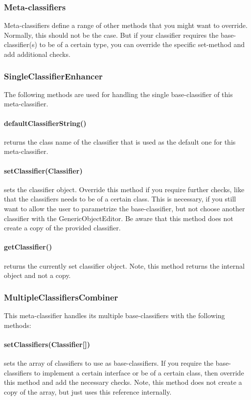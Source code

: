 \newpage
\subsubsection*{Meta-classifiers}
Meta-classifiers define a range of other methods that you might want to
override. Normally, this should not be the case. But if your classifier requires
the base-classifier(s) to be of a certain type, you can override the specific
set-method and add additional checks.

\subsubsection*{SingleClassifierEnhancer}
The following methods are used for handling the single base-classifier of this
meta-classifier.

\paragraph{defaultClassifierString()} returns the class name of the classifier
that is used as the default one for this meta-classifier.

\paragraph{setClassifier(Classifier)} sets the classifier object. Override this
method if you require further checks, like that the classifiers needs to be of
a certain class. This is necessary, if you still want to allow the user to
parametrize the base-classifier, but not choose another classifier with the
GenericObjectEditor. Be aware that this method does not create a copy of the
provided classifier.

\paragraph{getClassifier()} returns the currently set classifier object. Note,
this method returns the internal object and not a copy.

\subsubsection*{MultipleClassifiersCombiner}
This meta-classifier handles its multiple base-classifiers with the following
methods:

\paragraph{setClassifiers(Classifier[])} sets the array of classifiers to use
as base-classifiers. If you require the base-classifiers to implement a certain
interface or be of a certain class, then override this method and add the
necessary checks. Note, this method does not create a copy of the array, but
just uses this reference internally.

